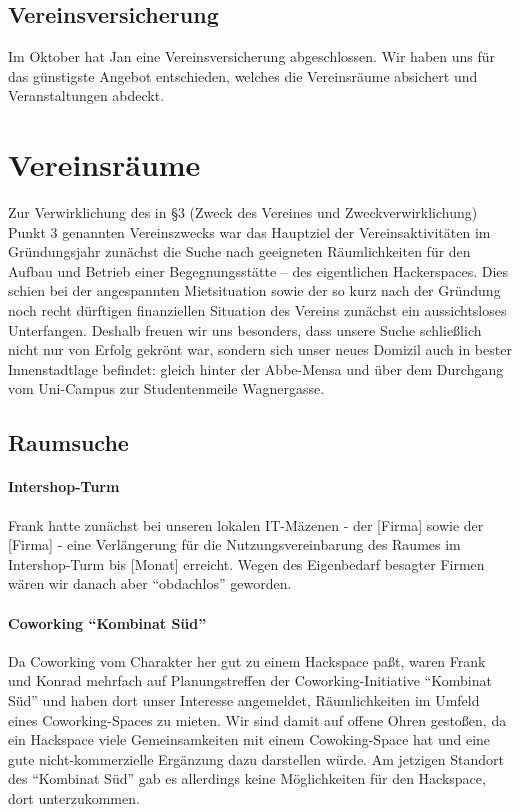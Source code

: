 \documentclass[10pt,DIV16]{scrartcl}
\begin{document}
\subsection{Vereinsversicherung}

Im Oktober hat Jan eine Vereinsversicherung abgeschlossen.  Wir haben uns für
das günstigste Angebot entschieden, welches die Vereinsräume absichert und
Veranstaltungen abdeckt.


\section{Vereinsräume}

Zur Verwirklichung des in §3 (Zweck des Vereines und Zweckverwirklichung)
Punkt 3 genannten Vereinszwecks war das Hauptziel der Vereinsaktivitäten im
Gründungsjahr zunächst die Suche nach geeigneten Räumlichkeiten für den Aufbau
und Betrieb einer Begegnungsstätte -- des eigentlichen Hackerspaces.  Dies
schien bei der angespannten Mietsituation sowie der so kurz nach der Gründung
noch recht dürftigen finanziellen Situation des Vereins zunächst ein
aussichtsloses Unterfangen.  Deshalb freuen wir uns besonders, dass unsere
Suche schließlich nicht nur von Erfolg gekrönt war, sondern sich unser neues
Domizil auch in bester Innenstadtlage befindet:  gleich hinter der Abbe-Mensa
und über dem Durchgang vom Uni-Campus zur Studentenmeile Wagnergasse.

\subsection{Raumsuche}

\paragraph{Intershop-Turm}

Frank hatte zunächst bei unseren lokalen IT-Mäzenen - der [Firma] sowie der
[Firma] - eine Verlängerung für die Nutzungsvereinbarung des Raumes im
Intershop-Turm bis [Monat] erreicht.  Wegen des Eigenbedarf besagter Firmen
wären wir danach aber "`obdachlos"' geworden.

\paragraph{Coworking ``Kombinat Süd''}

Da Coworking vom Charakter her gut zu einem Hackspace paßt, waren Frank und
Konrad mehrfach auf Planungstreffen der Coworking-Initiative "`Kombinat Süd"'
und haben dort unser Interesse angemeldet, Räumlichkeiten im Umfeld eines
Coworking-Spaces zu mieten.  Wir sind damit auf offene Ohren gestoßen, da ein
Hackspace viele Gemeinsamkeiten mit einem Cowoking-Space hat und eine gute
nicht-kommerzielle Ergänzung dazu darstellen würde.  Am jetzigen Standort des
"`Kombinat Süd"' gab es allerdings keine Möglichkeiten für den Hackspace, dort
unterzukommen.
\end{document}
